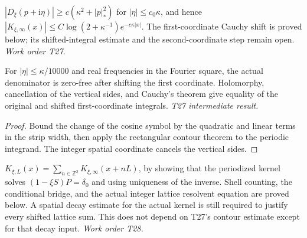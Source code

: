 \begin{lemma}\label{lem:contour}
  $|D_\xi(p+\mathrm{i}\eta)|\ge c(\kappa^2+|p|_*^2)$ for $|\eta|\le c_0\kappa$, and
  hence $|K_{\xi,\infty}(x)|\le C\log(2+\kappa^{-1})e^{-c\kappa|x|}$.
  The first-coordinate Cauchy shift is proved below; its shifted-integral
  estimate and the second-coordinate step remain open. \emph{Work order T27.}
\end{lemma}

\begin{lemma}\label{lem:contour-first}
  \leanok
  For $|\eta|\le\kappa/10000$ and real frequencies in the Fourier square,
  the actual denominator is zero-free after shifting the first coordinate.
  Holomorphy, cancellation of the vertical sides, and Cauchy's theorem give
  equality of the original and shifted first-coordinate integrals.
  \emph{T27 intermediate result.}
\end{lemma}
\begin{proof}\leanok
  Bound the change of the cosine symbol by the quadratic and linear terms in
  the strip width, then apply the rectangular contour theorem to the periodic
  integrand. The integer spatial coordinate cancels the vertical sides.
\end{proof}

\begin{lemma}[Periodization]\label{lem:periodize}
  $K_{\xi,L}(x)=\sum_{n\in\mathbb Z^2}K_{\xi,\infty}(x+nL)$, by showing that the
  periodized kernel solves $(1-\xi S)P=\delta_0$ and using uniqueness of the
  inverse. Shell counting, the conditional bridge, and the actual integer
  lattice resolvent equation are proved below. A spatial decay estimate for
  the actual kernel is still required to justify every shifted lattice sum.
  This does not depend on T27's contour estimate except for that decay input.
  \emph{Work order T28.}
\end{lemma}


